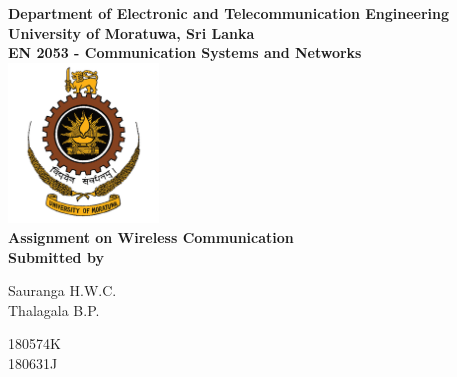 \begin{titlepage}
\center %

\textbf{\large Department of Electronic and Telecommunication Engineering}\\[0.5cm]
\textbf{\Large University of Moratuwa, Sri Lanka}\\[1cm]
\textbf{\large EN 2053 - Communication Systems and Networks}\\[2cm]
\includegraphics[width=0.3\textwidth]{figures/uomlogo}\\[2cm]

	
\textbf{\Huge Assignment on Wireless Communication}\\[6cm]



\textbf{\large Submitted by}\\[0.5cm]
\begin{minipage}{0.2\textwidth}
	\begin{flushleft}
		{\large Sauranga H.W.C.}\\[4mm]
		{\large Thalagala B.P.}\\[4mm]
		
	\end{flushleft}
\end{minipage}
\hspace{5mm}
\begin{minipage}{0.2\textwidth}
	\begin{flushright}
		{\large 180574K }\\[4mm]
		{\large 180631J }\\[4mm]
	\end{flushright}
\end{minipage}\\[1.5cm]


\end{titlepage}
